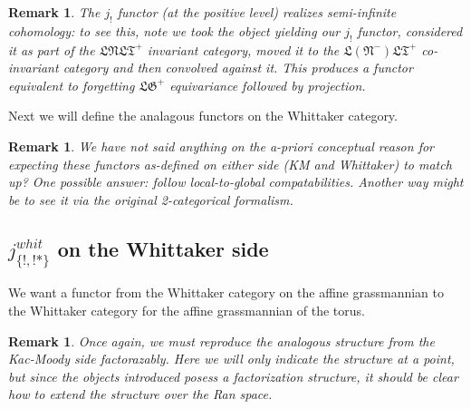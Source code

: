 \documentclass[12pt]{amsart}
\newtheorem{rmk}[thm]{Remark}
\newcommand\LT{\mathfrak{LT}}
\newcommand\LN{\mathfrak{LN}}
\newcommand\LNm{\mathfrak{L}(\mathfrak{N}^-)}
\newcommand\LG{\mathfrak{LG}}
\newcommand\DMod{\mathbf{Dmod}}
\newcommand\Gr{\mathbf{Gr}}
\newcommand\Whit{\mathbf{Whit}}
\newcommand\poslv{\kappa}
\begin{document}
  \begin{rmk}
    The $j_!$ functor (at the positive level) realizes semi-infinite cohomology:
    to see this, note we took the object yielding our $j_!$ functor, considered it
    as part of the $\LN\LT^+$ invariant category, moved it to the $\LNm\LT^+$
    co-invariant category and then convolved against it. This produces a functor
    equivalent to forgetting $\LG^+$ equivariance followed by projection.
  \end{rmk}

  Next we will define the analagous functors on the Whittaker category.


  \begin{rmk}
  We have not said anything on the a-priori conceptual reason for expecting these
  functors as-defined on either side (KM and Whittaker) to match up? One
  possible answer: follow local-to-global compatabilities. Another way might be
  to see it via the original 2-categorical formalism.
  \end{rmk}

\subsection{$j_{\{!,!*\}}^{whit}$ on the Whittaker side}

We want a functor from the Whittaker category on the affine
grassmannian\footnotemark{} to the Whittaker
category for the affine grassmannian of the
torus\footnotemark{}.


  \begin{rmk}
  Once again, we must reproduce the analogous structure from the Kac-Moody side
  factorazably. Here we will only indicate the structure at a point, but since
  the objects introduced posess a factorization structure, it should be clear
  how to extend the structure over the Ran space.
  \end{rmk}
\end{document}
